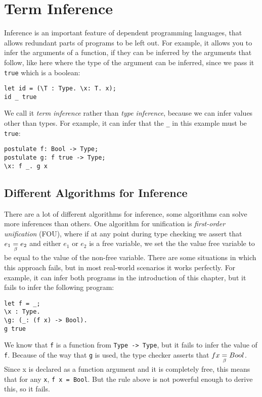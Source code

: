 \chapter{Term Inference}
\label{ch:inference}

Inference is an important feature of dependent programming languages, that allows redundant parts of programs to be left out. For example, it allows you to infer the arguments of a function, if they can be inferred by the arguments that follow, like here where the type of the argument can be inferred, since we pass it \verb|true| which is a boolean:
\begin{lstlisting}
let id = (\T : Type. \x: T. x);
id _ true
\end{lstlisting}

We call it \emph{term inference} rather than \emph{type inference}, because we can infer values other than types. For example, it can infer that the \verb|_| in this example must be \verb|true|:
\begin{lstlisting}
postulate f: Bool -> Type;
postulate g: f true -> Type;
\x: f _. g x
\end{lstlisting}

\section{Different Algorithms for Inference}
\label{strength-inference}

There are a lot of different algorithms for inference\cite{typeinference}, some algorithms can solve more inferences than others. One algorithm for unification is \emph{first-order unification} (FOU), where if at any point during type checking we assert that $e_1 \underset{\beta}{=} e_2$ and either $e_1$ or $e_2$ is a free variable, we set the the value free variable to be equal to the value of the non-free variable. There are some situations in which this approach fails, but in most real-world scenarios it works perfectly. For example, it can infer both programs in the introduction of this chapter, but it fails to infer the following program:

\begin{lstlisting}
let f = _;
\x : Type.
\g: (_: (f x) -> Bool).
g true
\end{lstlisting}

We know that \verb|f| is a function from \verb|Type -> Type|, but it fails to infer the value of \verb|f|. Because of the way that \verb|g| is used, the type checker asserts that $f x \underset{\beta}{=} Bool$. Since x is declared as a function argument and it is completely free, this means that for any \verb|x|, \verb|f x = Bool|. But the rule above is not powerful enough to derive this, so it fails.

